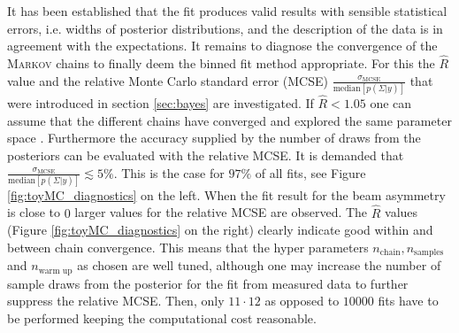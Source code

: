 It has been established that the fit produces valid results with sensible statistical errors, i.e. widths of posterior distributions, and the description of the data is in agreement with the expectations. It remains to diagnose the convergence of the \textsc{Markov} chains to finally deem the binned fit method appropriate. For this the $\widehat{R}$ value and the relative Monte Carlo standard error (MCSE) $\frac{\sigma_\text{MCSE}}{\text{median}\left[p\left(\Sigma|y\right)\right]}$ that were introduced in section \ref{sec:bayes} are investigated. If $\widehat{R}<1.05$ one can assume that the different chains have converged and explored the same parameter space \cite{rhat}. Furthermore the accuracy supplied by the number of draws from the posteriors can be evaluated with the relative MCSE. It is demanded that $\frac{\sigma_\text{MCSE}}{\text{median}\left[p\left(\Sigma|y\right)\right]}\lesssim 5\%$. This is the case for $97\%$ of all fits, see Figure \ref{fig:toyMC_diagnostics} on the left. When the fit result for the beam asymmetry is close to $0$ larger values for the relative MCSE are observed. The $\widehat{R}$ values (Figure \ref{fig:toyMC_diagnostics} on the right) clearly indicate good within and between chain convergence. This means that the hyper parameters $n_\text{chain},n_\text{samples}$ and $n_\text{warm up}$ as chosen are well tuned, although one may increase the number of sample draws from the posterior for the fit from measured data to further suppress the relative MCSE. Then, only $11\cdot12$  as opposed to $10000$ fits have to be performed keeping the computational cost reasonable.    
